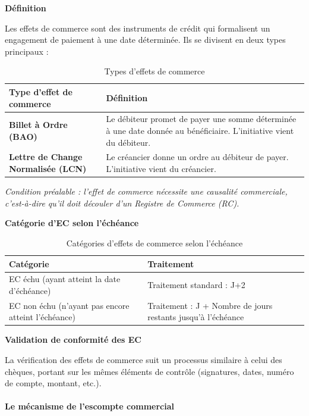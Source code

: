 \documentclass[12pt,a4paper]{report}
\begin{document}
\medskip\textbf{Définition}

Les effets de commerce sont des instruments de crédit qui formalisent un engagement de paiement à une date déterminée. Ils se divisent en deux types principaux :

\begin{table}[h!]
\centering
\begin{tabularx}{\textwidth}{>{\bfseries}l X}
\toprule
Type d'effet de commerce & Définition \\
\midrule
Billet à Ordre (BAO) & Le débiteur promet de payer une somme déterminée à une date donnée au bénéficiaire. L'initiative vient du débiteur. \\
\addlinespace
Lettre de Change Normalisée (LCN) & Le créancier donne un ordre au débiteur de payer. L'initiative vient du créancier. \\
\bottomrule
\end{tabularx}
\caption{Types d'effets de commerce}
\end{table}

\textit{Condition préalable : l'effet de commerce nécessite une causalité commerciale, c'est-à-dire qu'il doit découler d'un Registre de Commerce (RC).}

\medskip\textbf{Catégorie d'EC selon l'échéance}

\begin{table}[h!]
\centering
\begin{tabularx}{\textwidth}{X X}
\toprule
Catégorie & Traitement \\
\midrule
EC échu (ayant atteint la date d'échéance) & Traitement standard : J+2 \\
EC non échu (n'ayant pas encore atteint l'échéance) & Traitement : J + Nombre de jours restants jusqu'à l'échéance \\
\bottomrule
\end{tabularx}
\caption{Catégories d'effets de commerce selon l'échéance}
\end{table}

\medskip\textbf{Validation de conformité des EC}

La vérification des effets de commerce suit un processus similaire à celui des chèques, portant sur les mêmes éléments de contrôle (signatures, dates, numéro de compte, montant, etc.).

\paragraph{Le mécanisme de l'escompte commercial}
\end{document}
